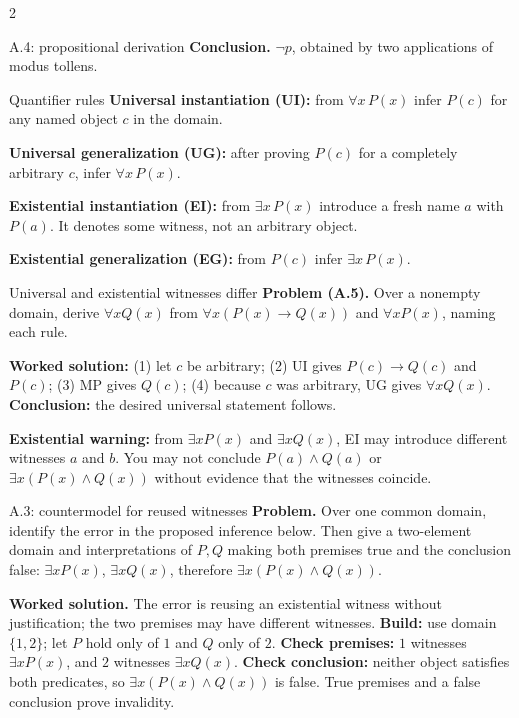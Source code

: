 \documentclass[10pt]{article}
\newcommand{\term}[1]{\textbf{\color{CoreNavy}#1}}
\begin{document}
\begin{multicols}{2}
\begin{workedbox}{A.4: propositional derivation}
\textbf{Conclusion.} $\neg p$, obtained by two applications of modus tollens.
\end{workedbox}


\begin{definitionbox}{Quantifier rules}
\term{Universal instantiation (UI):} from $\forall x\,P(x)$ infer $P(c)$ for
any named object $c$ in the domain.

\term{Universal generalization (UG):} after proving $P(c)$ for a completely
arbitrary $c$, infer $\forall x\,P(x)$.

\term{Existential instantiation (EI):} from $\exists x\,P(x)$ introduce a
fresh name $a$ with $P(a)$. It denotes some witness, not an arbitrary object.

\term{Existential generalization (EG):} from $P(c)$ infer $\exists x\,P(x)$.
\end{definitionbox}

\begin{methodbox}{Universal and existential witnesses differ}
\textbf{Problem (A.5).} Over a nonempty domain, derive $\forall xQ(x)$ from $\forall x(P(x)\to Q(x))$ and $\forall xP(x)$, naming each rule.\par\textbf{Worked solution:}
(1) let $c$ be arbitrary; (2) UI gives $P(c)\to Q(c)$ and $P(c)$; (3) MP
gives $Q(c)$; (4) because $c$ was arbitrary, UG gives $\forall xQ(x)$.
\textbf{Conclusion:} the desired universal statement follows.

\textbf{Existential warning:} from $\exists xP(x)$ and $\exists xQ(x)$, EI may
introduce different witnesses $a$ and $b$. You may not conclude
$P(a)\land Q(a)$ or
$\exists x(P(x)\land Q(x))$ without evidence that the witnesses coincide.
\end{methodbox}

\begin{workedbox}{A.3: countermodel for reused witnesses}
\textbf{Problem.} Over one common domain, identify the error in the proposed inference below. Then give a two-element domain and interpretations of $P,Q$ making both premises true and the conclusion false: $\exists xP(x)$, $\exists xQ(x)$, therefore $\exists x(P(x)\land Q(x))$.

\textbf{Worked solution.} The error is reusing an existential witness without justification; the two premises may have different witnesses. \textbf{Build:} use domain $\{1,2\}$; let $P$ hold only of $1$ and $Q$ only of
$2$. \textbf{Check premises:} $1$ witnesses $\exists xP(x)$, and $2$ witnesses
$\exists xQ(x)$. \textbf{Check conclusion:} neither object satisfies both
predicates, so $\exists x(P(x)\land Q(x))$ is false. True premises and a false
conclusion prove invalidity.


\end{workedbox}
\end{multicols}
\end{document}
